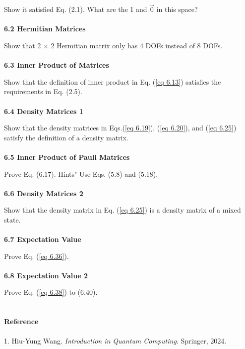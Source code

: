 \documentclass{article}
\begin{document}
Show it satisfied Eq. (2.1). What are the 1 and $\vec{0}$ in this space?\\\\
\textbf{6.2 Hermitian Matrices}

Show that 2 $\times$ 2 Hermitian matrix only has 4 DOFs instead of 8 DOFs.\\\\
\textbf{6.3 Inner Product of Matrices}

Show that the definition of inner product in Eq. (\ref{eq 6.13}) satisfies
the requirements in Eq. (2.5).\\\\
\textbf{6.4 Density Matrices 1}

Show that the density matrices in Eqs.(\ref{eq 6.19}), (\ref{eq 6.20}), and
(\ref{eq 6.25}) satisfy the definition of a density matrix.\\\\
\textbf{6.5 Inner Product of Pauli Matrices}

Prove Eq. (6.17). Hints" Use Eqs. (5.8) and (5.18).\\\\
\textbf{6.6 Density Matrices 2}

Show that the density matrix in Eq. (\ref{eq 6.25}) is a density matrix of a mixed state.\\\\
\textbf{6.7 Expectation Value}

Prove Eq. (\ref{eq 6.36}).\\\\
\textbf{6.8 Expectation Value 2}

Prove Eq. (\ref{eq 6.38}) to (6.40).\\\\\\
\textbf{\large Reference}\\\\
1. Hiu-Yung Wang. \textit{Introduction in Quantum Computing}. Springer, 2024.
\end{document}
